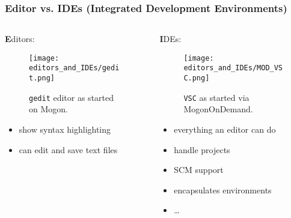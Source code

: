 \begin{frame}
  \frametitle{Editor vs. IDEs (Integrated Development Environments)}
  \footnotesize
  \begin{columns}[t]
  	\begin{column}{.5\textwidth}
  	  {\normalsize\textbf Editors:}
  	  \begin{figure}[t]
  		 \texttt{[image: editors\_and\_IDEs/gedit.png]}
  		 \caption*{\texttt{gedit} editor as started on Mogon.}
  	  \end{figure}
      \vfill
  	  \begin{itemize}
  	  	\item show syntax highlighting
  	  	\item can edit and save text files
  	  \end{itemize}  
  	\end{column}
  	\begin{column}{.5\textwidth}
  	  {\normalsize\textbf IDEs:}
  	  \begin{figure}[t]
  	  	\texttt{[image: editors\_and\_IDEs/MOD\_VSC.png]}
  		\caption*{\texttt{VSC} as started via MogonOnDemand.}
  	  \end{figure}
      \vfill
      \begin{itemize}
         \item everything an editor can do
         \item handle projects
         \item SCM support
         \item encapsulates environments
         \item \ldots
      \end{itemize}  
  	\end{column}
  \end{columns}
\end{frame}

